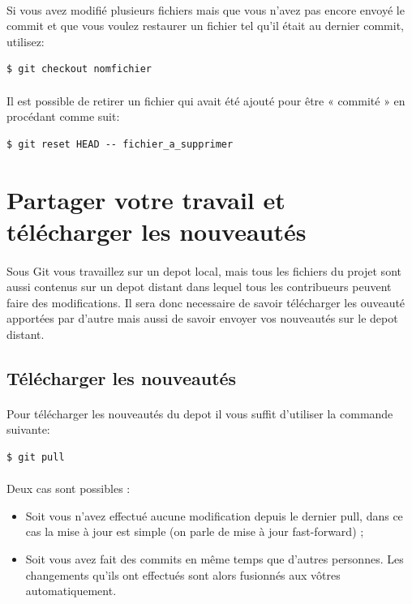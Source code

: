 \documentclass[french, a4paper, 12pt, titlepage]{article}
\begin{document}
\paragraph{}Si vous avez modifié plusieurs fichiers mais que vous n’avez pas encore envoyé le commit et que vous voulez restaurer un fichier tel qu’il était au dernier commit, utilisez:
\begin{lstlisting}
$ git checkout nomfichier
\end{lstlisting}
\paragraph{}Il est possible de retirer un fichier qui avait été ajouté pour être « commité » en procédant comme suit:
\begin{lstlisting}
$ git reset HEAD -- fichier_a_supprimer
\end{lstlisting}

\section{Partager votre travail et télécharger les nouveautés}
\paragraph{}Sous Git vous travaillez sur un depot local, mais tous les fichiers du projet sont aussi contenus sur un depot distant dans lequel tous les contribueurs peuvent faire des modifications. Il sera donc necessaire de savoir télécharger les ouveauté apportées par d'autre mais aussi de savoir envoyer vos nouveautés sur le depot distant.
\subsection{Télécharger les nouveautés}
\paragraph{}Pour télécharger les nouveautés du depot il vous suffit d'utiliser la commande suivante:
\begin{lstlisting}
$ git pull
\end{lstlisting}
\paragraph{}Deux cas sont possibles :
\begin{itemize}
\item Soit vous n’avez effectué aucune modification depuis le dernier pull, dans ce cas la mise à jour est simple (on parle de mise à jour fast-forward) ;
\item Soit vous avez fait des commits en même temps que d’autres personnes. Les changements qu’ils ont effectués sont alors fusionnés aux vôtres automatiquement.
\end{itemize}
\end{document}
